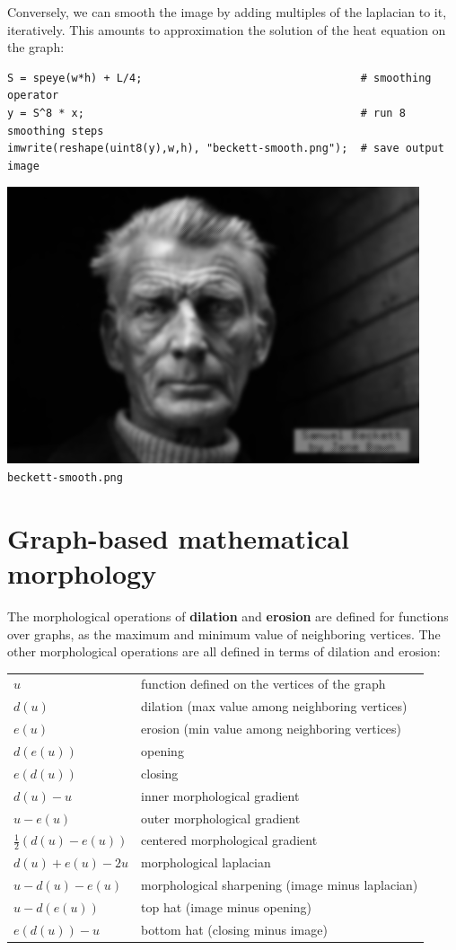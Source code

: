 Conversely, we can smooth the image by adding multiples of the laplacian to
it, iteratively.  This amounts to approximation the solution of the heat
equation on the graph:

\begin{verbatim}
S = speye(w*h) + L/4;                                  # smoothing operator
y = S^8 * x;                                           # run 8 smoothing steps
imwrite(reshape(uint8(y),w,h), "beckett-smooth.png");  # save output image
\end{verbatim}

\includegraphics{beckett-smooth.png}
\verb+beckett-smooth.png+

\section{Graph-based mathematical morphology}

The morphological operations of {\bf dilation} and {\bf erosion} are
defined for functions over graphs, as the maximum and minimum value of
neighboring vertices.  The other morphological operations are all defined in
terms of dilation and erosion:

\begin{tabular}{ll}
	$u$ & function defined on the vertices of the graph \\
	$d(u)$ & dilation (max value among neighboring vertices) \\
	$e(u)$ & erosion (min value among neighboring vertices) \\
	$d(e(u))$ & opening \\
	$e(d(u))$ & closing \\
	$d(u) - u$ & inner morphological gradient \\
	$u - e(u)$ & outer morphological gradient \\
	$\frac{1}{2}(d(u) - e(u))$ & centered morphological gradient \\
	$d(u) + e(u) - 2u$ & morphological laplacian \\
	$u - d(u) - e(u)$ & morphological sharpening (image minus laplacian) \\
	$u - d(e(u))$ & top hat (image minus opening) \\
	$e(d(u)) -u$ & bottom hat (closing minus image) \\
\end{tabular}

